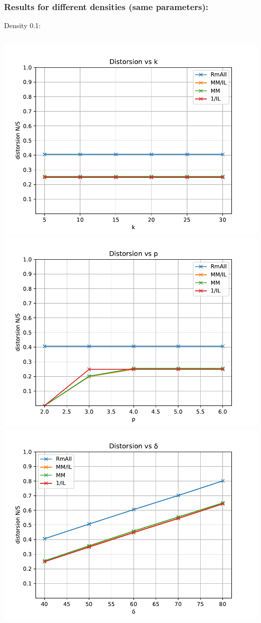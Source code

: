 \documentclass{beamer}
\begin{document}
\begin{frame}[fragile]
\frametitle{Results for different densities (same parameters):}
Density 0.1:
\begin{columns}[t]
\includegraphics[scale=0.27]{img/plt_ds_x10000_y20_d01_k_}
\includegraphics[scale=0.27]{img/plt_ds_x10000_y20_d01_p_}
\includegraphics[scale=0.27]{img/plt_ds_x10000_y20_d01_delta_}

\end{columns}
\end{frame}
\end{document}
